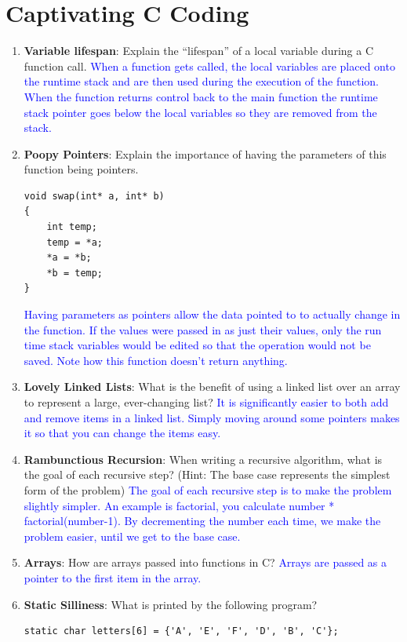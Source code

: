 \documentclass{article}
\begin{document}
\section{Captivating C Coding}
\begin{enumerate}[label=(\alph*)]
    \item \textbf{Variable lifespan}: Explain the “lifespan” of a local variable during a C function call.
    \newline\textcolor{blue}{When a function gets called, the local variables are placed onto the runtime stack and are then used during the execution of the function. When the function returns control back to the main function the runtime stack pointer goes below the local variables so they are removed from the stack.
    }
    
    \item \textbf{Poopy Pointers}: Explain the importance of having the parameters of this function being pointers.
    
    \begin{lstlisting}[style=CStyle]
void swap(int* a, int* b)
{
    int temp;
    temp = *a;
    *a = *b;
    *b = temp;
} \end{lstlisting}

    \textcolor{blue}{Having parameters as pointers allow the data pointed to to actually change in the function. If the values were passed in as just their values, only the run time stack variables would be edited so that the operation would not be saved. Note how this function doesn't return anything.
    }
 
    \item \textbf{Lovely Linked Lists}: What is the benefit of using a linked list over an array to represent a large, ever-changing list?
    \newline\textcolor{blue}{It is significantly easier to both add and remove items in a linked list. Simply moving around some pointers makes it so that you can change the items easy.
    }
    \item \textbf{Rambunctious Recursion}: When writing a recursive algorithm, what is the goal of each recursive step? (Hint: The base case represents the simplest form of the problem)
    \newline\textcolor{blue}{The goal of each recursive step is to make the problem slightly simpler. An example is factorial, you calculate number * factorial(number-1). By decrementing the number each time, we make the problem easier, until we get to the base case.
    }
    \item \textbf{Arrays}: How are arrays passed into functions in C?
    \newline\textcolor{blue}{Arrays are passed as a pointer to the first item in the array. 
    }
    \item \textbf{Static Silliness}:  What is printed by the following program?
    \begin{lstlisting}[style=CStyle] 
static char letters[6] = {'A', 'E', 'F', 'D', 'B', 'C'};


\end{lstlisting}
\end{enumerate}
\end{document}
